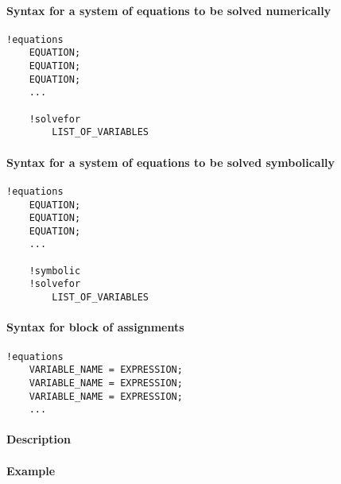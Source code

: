 


	\paragraph{Syntax for a system of equations to be solved
numerically}

\begin{verbatim}
!equations
    EQUATION;
    EQUATION;
    EQUATION;
    ...

    !solvefor
        LIST_OF_VARIABLES
\end{verbatim}

\paragraph{Syntax for a system of equations to be solved
symbolically}

\begin{verbatim}
!equations
    EQUATION;
    EQUATION;
    EQUATION;
    ...

    !symbolic
    !solvefor
        LIST_OF_VARIABLES
\end{verbatim}

\paragraph{Syntax for block of
assignments}

\begin{verbatim}
!equations
    VARIABLE_NAME = EXPRESSION;
    VARIABLE_NAME = EXPRESSION;
    VARIABLE_NAME = EXPRESSION;
    ...
\end{verbatim}

\paragraph{Description}

\paragraph{Example}


